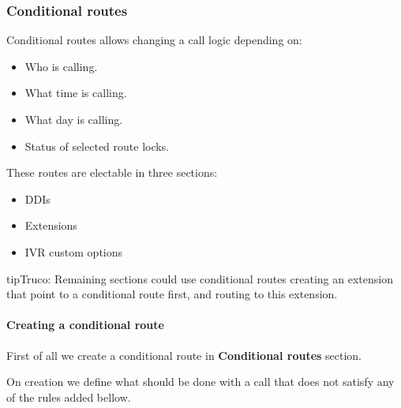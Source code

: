 \documentclass[letterpaper,10pt,spanish]{sphinxmanual}
\begin{document}
\subsubsection{Conditional routes}
\label{administration_portal/client/vpbx/routing_endpoints/conditional_routes:id2}\label{administration_portal/client/vpbx/routing_endpoints/conditional_routes::doc}\label{administration_portal/client/vpbx/routing_endpoints/conditional_routes:conditional-routes}\label{administration_portal/client/vpbx/routing_endpoints/conditional_routes:id1}
Conditional routes allows changing a call logic depending on:
\begin{itemize}
\item {} 
Who is calling.

\item {} 
What time is calling.

\item {} 
What day is calling.

\item {} 
Status of selected route locks.

\end{itemize}

These routes are electable in three sections:
\begin{itemize}
\item {} 
DDIs

\item {} 
Extensions

\item {} 
IVR custom options

\end{itemize}

\begin{notice}{tip}{Truco:}
Remaining sections could use conditional routes creating an extension
that point to a conditional route first, and routing to this extension.
\end{notice}


\paragraph{Creating a conditional route}
\label{administration_portal/client/vpbx/routing_endpoints/conditional_routes:creating-a-conditional-route}
First of all we create a conditional route in \textbf{Conditional routes} section.

On creation we define what should be done with a call that does not satisfy any
of the rules added bellow.
\end{document}

